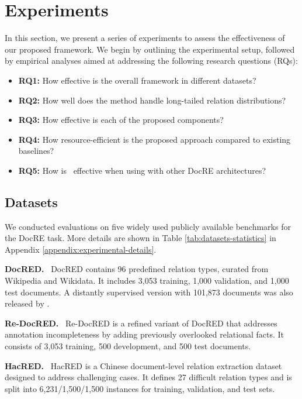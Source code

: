 \section{Experiments}
In this section, we present a series of experiments to assess the effectiveness of our proposed framework. We begin by outlining the experimental setup, followed by empirical analyses aimed at addressing the following research questions (RQs):
\begin{itemize}[noitemsep]
    \item \textbf{RQ1:} How effective is the overall framework in different datasets?
    \item \textbf{RQ2:} How well does the method handle long-tailed relation distributions?
    \item \textbf{RQ3:} How effective is each of the proposed components?
    \item \textbf{RQ4:} How resource-efficient is the proposed approach compared to existing baselines?
    \item \textbf{RQ5:} How is \model\ effective when using with other DocRE architectures?
\end{itemize}


\subsection{Datasets}
\label{subsec:experimental-setup}
We conducted evaluations on five widely used publicly available benchmarks for the DocRE task. More details are shown in Table \ref{tab:datasets-statistics} in Appendix \ref{appendix:experimental-details}.

\noindent
\textbf{DocRED.} \ DocRED contains 96 predefined relation types, curated from Wikipedia and Wikidata. It includes 3,053 training, 1,000 validation, and 1,000 test documents. A distantly supervised version with 101,873 documents was also released by \citet{yao2019docred}.

\noindent
\textbf{Re-DocRED.} \ Re-DocRED is a refined variant of DocRED that addresses annotation incompleteness by adding previously overlooked relational facts. It consists of 3,053 training, 500 development, and 500 test documents.

\noindent
\textbf{HacRED.} \ HacRED is a Chinese document-level relation extraction dataset designed to address challenging cases. It defines 27 difficult relation types and is split into 6,231/1,500/1,500 instances for training, validation, and test sets.

